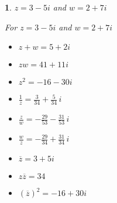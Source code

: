 \documentclass{amsbook}
\newtheorem{exc}{}
\newenvironment{ex}{\begin{exc}\normalfont}{\end{exc}}
\numberwithin{section}{chapter}
\numberwithin{equation}{chapter}
\begin{document}
\begin{ex}
	 $z = 3-5i$ and $w = 2+7i$

	\begin{sol}
		For  $z = 3-5i$ and $w = 2+7i$
		
		\begin{multicols}{3}
			
			\begin{itemize}
				
				\item $z+w = 5+2i$
				
				\item $zw = 41+11i$
				
				\item $z^2 = -16-30i$
				
			\end{itemize}
			
		\end{multicols}
		
		\begin{multicols}{3}
			
			\begin{itemize}
				
				\item $\frac{1}{z} = \frac{3}{34} + \frac{5}{34} \,i$
				
				\item $\frac{z}{w} = -\frac{29}{53} - \frac{31}{53} \, i$
				
				\item $\frac{w}{z} = -\frac{29}{34} + \frac{31}{34} \,i$
				
			\end{itemize}
			
		\end{multicols}
		
		\begin{multicols}{3}
			
			\begin{itemize}
				
				\item $\overline{z} = 3+5i$
				
				\item $z\overline{z} = 34$
				
				\item $(\overline{z})^2 = -16+30i$
				
			\end{itemize}
			
		\end{multicols}
	\end{sol}
\end{ex}
\end{document}
